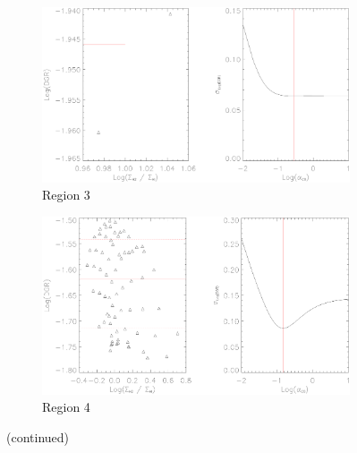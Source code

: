 \begin{figure}  
  \ContinuedFloat
  \begin{subfigure}[t]{1\textwidth}
    \centering
    \includegraphics[width=1.\textwidth]{dgr_imgs/region_3_aco_output_10.eps}
    \caption{Region 3}
    \label{fig:dgr_co10_3}
  \end{subfigure}

  \begin{subfigure}[t]{1\textwidth}
    \centering
    \includegraphics[width=1.\textwidth]{dgr_imgs/region_4_aco_output_10.eps}
    \caption{Region 4}
  \end{subfigure}
   \caption{(continued)}
   \label{fig:dgr_co10}
\end{figure}

